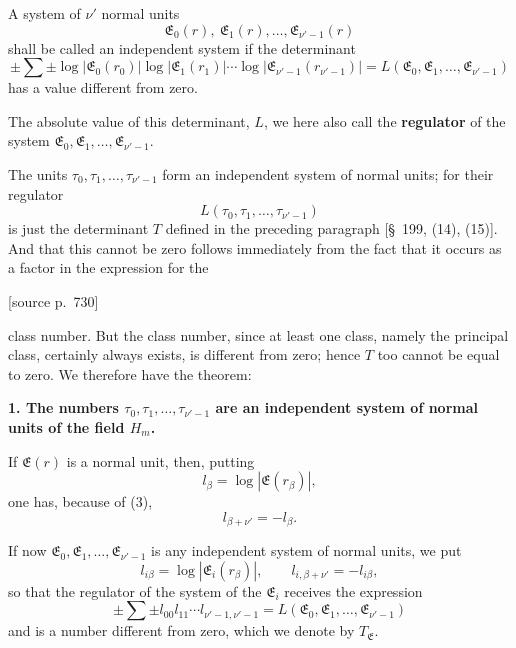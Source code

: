 \documentclass[11pt]{article}
\newcommand{\srcpage}[1]{\par\medskip\noindent\textsf{[source p.~#1]}\par\smallskip}
\begin{document}
A system of $\nu'$ normal units
\[
\mathfrak E_0(r),\ \mathfrak E_1(r),\ldots,\mathfrak E_{\nu'-1}(r)
\]
shall be called an independent system if the determinant
\begin{equation}
\pm\sum\pm\log|\mathfrak E_0(r_0)|\log|\mathfrak E_1(r_1)|\cdots\log|\mathfrak E_{\nu'-1}(r_{\nu'-1})|
=L(\mathfrak E_0,\mathfrak E_1,\ldots,\mathfrak E_{\nu'-1})
\tag{6}
\end{equation}
has a value different from zero.

The absolute value of this determinant, $L$, we here also call the \textbf{regulator} of the system $\mathfrak E_0,\mathfrak E_1,\ldots,\mathfrak E_{\nu'-1}$.

The units $\tau_0,\tau_1,
\ldots,\tau_{\nu'-1}$ form an independent system of normal units; for their regulator
\[
L(\tau_0,\tau_1,\ldots,\tau_{\nu'-1})
\]
is just the determinant $T$ defined in the preceding paragraph [\S~199, (14), (15)]. And that this cannot be zero follows immediately from the fact that it occurs as a factor in the expression for the
\srcpage{730}
class number. But the class number, since at least one class, namely the principal class, certainly always exists, is different from zero; hence $T$ too cannot be equal to zero. We therefore have the theorem:

\begin{center}\textbf{1. The numbers $\tau_0,\tau_1,\ldots,\tau_{\nu'-1}$ are an independent system of normal units of the field $H_m$.}\end{center}

If $\mathfrak E(r)$ is a normal unit, then, putting
\begin{equation}
l_\beta=\log|\mathfrak E(r_\beta)|,
\tag{7}
\end{equation}
one has, because of (3),
\begin{equation}
l_{\beta+\nu'}=-l_\beta.
\tag{8}
\end{equation}

If now $\mathfrak E_0,\mathfrak E_1,\ldots,\mathfrak E_{\nu'-1}$ is any independent system of normal units, we put
\begin{equation}
l_{i\beta}=\log|\mathfrak E_i(r_\beta)|,\qquad l_{i,\beta+\nu'}=-l_{i\beta},
\tag{9}
\end{equation}
so that the regulator of the system of the $\mathfrak E_i$ receives the expression
\begin{equation}
\pm\sum\pm l_{00}l_{11}\cdots l_{\nu'-1,\nu'-1}=L(\mathfrak E_0,\mathfrak E_1,\ldots,\mathfrak E_{\nu'-1})
\tag{10}
\end{equation}
and is a number different from zero, which we denote by $T_\mathfrak E$.
\end{document}
